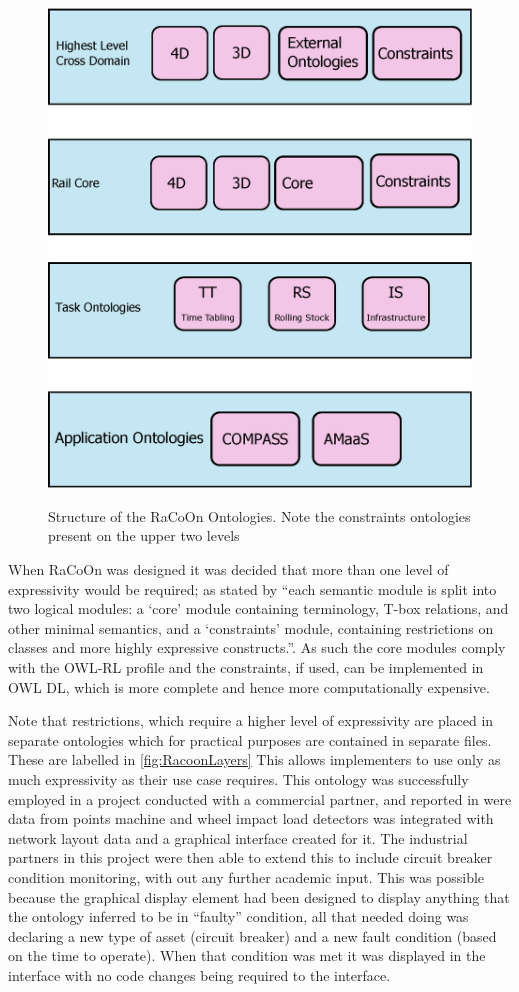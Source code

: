 \begin{figure}[htb]
\myfloatalign
{\includegraphics[width=0.6\linewidth,keepaspectratio]{gfx/RacoonLayers}}  
\caption[Racoon Layers]{Structure of the RaCoOn Ontologies. Note the constraints ontologies present on the upper two levels}
\label{fig:RacoonLayers}
\end{figure}

When RaCoOn was designed it was decided that more than one level of expressivity would be required; as stated by \citet{Tutcher2015} ``each semantic module is split into two logical modules: a ‘core’ module containing terminology, T-box relations, and other minimal semantics, and a ‘constraints’ module, containing restrictions on classes and more highly expressive constructs.''. As such the core modules comply with the OWL-RL profile and the constraints, if used, can be implemented in OWL DL, which is more complete and hence more computationally expensive. 

Note that restrictions, which require a higher level of expressivity are placed in separate ontologies which for practical purposes are contained in separate files. These are labelled  in \autoref{fig:RacoonLayers} This allows implementers to use only as much expressivity as their use case requires. This ontology was successfully employed in a project conducted with a commercial partner, and reported in \citet{Tutcher2015a} were data from points machine and wheel impact load detectors was integrated with network layout data and a graphical interface created for it. The industrial partners in this project were then able to extend this to include circuit breaker condition monitoring, with out any further academic input. This was possible because the graphical display element had been designed to display anything that the ontology inferred to be in ``faulty'' condition, all that needed doing was declaring a new type of asset (circuit breaker) and a new fault condition (based on the time to operate). When that condition was met it was displayed in the interface with no code changes being required to the interface. 

